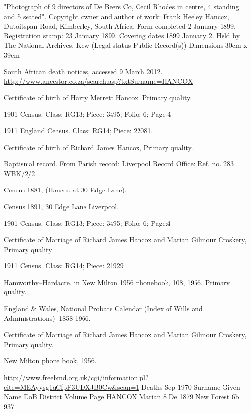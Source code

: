 \begin{thebibliography}{99}
	"Photograph of 9 directors of De Beers Co, Cecil Rhodes in centre, 4 standing and 5 seated".
	Copyright owner and author of work: Frank Heeley Hancox, Dutoitspan Road, Kimberley, South Africa.
	Form completed 2 January 1899. Registration stamp: 23 January 1899.
	Covering dates 1899 January 2. Held by The National Archives, Kew (Legal status Public Record(s))
	Dimensions 30cm x 39cm

	South African death notices, accessed 9 March 2012.
	\url{http://www.ancestor.co.za/search.asp?txtSurname=HANCOX}
	
	Certificate of birth of Harry Merrett Hancox, Primary quality.
	
	1901 Census. Class: RG13; Piece: 3495; Folio: 6; Page 4
	
	1911 England Census. Class: RG14; Piece: 22081.
	
	Certificate of birth of Richard James Hancox, Primary quality.
	
	 Baptismal record. From Parish record: Liverpool Record Office: Ref. no. 283 WBK/2/2
	 
	Census 1881, (Hancox at 30 Edge Lane).
	
	Census 1891, 30 Edge Lane Liverpool.

	1901 Census. Class: RG13; Piece: 3495; Folio: 6; Page:4

	 Certificate of Marriage of Richard James Hancox and Marian Gilmour Croskery, Primary quality
	 
	1911 Census. Class: RG14; Piece: 21929
	
	Hamworthy--Hardacre, in New Milton 1956 phonebook, 108, 1956, Primary quality.
	
	England \& Wales, National Probate Calendar (Index of Wills and Administrations), 1858-1966.
	 
	Certificate of Marriage of Richard James Hancox and Marian Gilmour Croskery, Primary quality.
	
	New Milton phone book, 1956. 
	
	\url{http://www.freebmd.org.uk/cgi/information.pl?cite=MEAyysg1qCfpF3UDXJB0Cw&scan=1}
	Deaths Sep 1970
	Surname     Given Name      DoB         District    Volume      Page    
	HANCOX      Marian          8 De 1879   New Forest  6b          937
	

\end{thebibliography}
